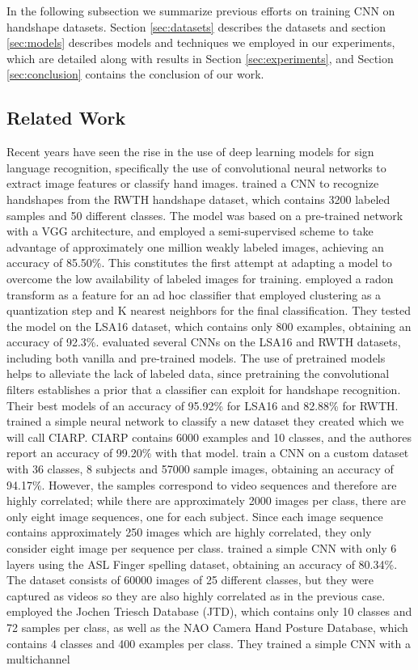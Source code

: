 In the following subsection we summarize previous efforts on training CNN on handshape datasets. Section \ref{sec:datasets} describes the datasets and section \ref{sec:models} describes models and techniques we employed in our experiments, which are detailed along with results in Section \ref{sec:experiments}, and Section \ref{sec:conclusion} contains the conclusion of our work.

\subsection{Related Work}

Recent years have seen the rise in the use of deep learning models for sign language recognition, specifically the use of convolutional neural networks to extract image features or classify hand images. \cite{koller16}  trained a CNN to recognize handshapes  from the  RWTH handshape dataset,  which contains 3200 labeled samples and 50 different classes.  The model was based on a pre-trained network with a VGG architecture, and employed a semi-supervised scheme to take advantage of approximately  one million weakly labeled images, achieving an accuracy of 85.50\%. This constitutes the first attempt at adapting a model to overcome the low availability of labeled images for training. \cite{Ronchetti2016}  employed a radon transform as a feature for an ad hoc classifier that employed clustering as a quantization step and K nearest  neighbors  for the final classification. They tested the model on the LSA16 dataset, which contains only 800 examples, obtaining an accuracy of 92.3\%. \cite{quiroga2017study}  evaluated several CNNs on the LSA16 and RWTH datasets, including both vanilla and pre-trained models. The use of pretrained models helps to alleviate the lack of labeled data, since pretraining the convolutional filters establishes a prior that a classifier can exploit for handshape recognition. Their best models of an accuracy of 95.92\% for LSA16 and 82.88\%  for RWTH. \cite{ciarp2018} trained a simple neural network to classify a new dataset they created which we will call CIARP. CIARP contains 6000 examples and 10 classes, and the authores report an accuracy of 99.20\% with that model. \cite{tang2015real} train a CNN on a custom dataset with 36 classes, 8 subjects and 57000 sample images, obtaining an accuracy of 94.17\%. However, the samples correspond to video sequences and therefore are highly correlated;  while there are approximately 2000 images per class, there are only eight image sequences, one for each subject. Since each image sequence contains approximately 250 images  which are highly correlated, they only consider eight image per sequence per class. \cite{ameen2017fingerspelling} trained a simple CNN with only 6 layers using the ASL Finger spelling dataset, obtaining an accuracy of 80.34\%. The dataset consists of 60000 images of 25 different classes, but they were captured as videos so they are also highly correlated as in the previous case. \cite{barros14multichannel} employed the Jochen Triesch Database (JTD), which contains only 10 classes and  72 samples per class, as well as the NAO Camera Hand Posture Database, which contains 4 classes and 400 examples per class. They trained a simple CNN with a multichannel 